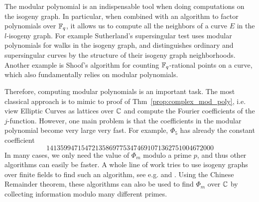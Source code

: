 The modular polynomial is an indispensable tool when doing computations on the isogeny graph.
In particular, when combined with an algorithm to factor polynomials over $\mathbb{F}_q$, it allows us to compute all the neighbors of a curve $E$ in the $l$-isogeny graph.
For example Sutherland's supersingular test \cite{sutherland_supersingularity_test} uses modular polynomials for walks in the isogeny graph, and distinguishes ordinary and supersingular curves by the structure of their isogeny graph neighborhoods.
Another example is Shoof's algorithm \cite{shoof_point_counting} for counting $\mathbb{F}_q$-rational points on a curve, which also fundamentally relies on modular polynomials.

Therefore, computing modular polynomials is an important task.
The most classical approach is to mimic to proof of Thm~\ref{prop:complex_mod_poly}, i.e. view Elliptic Curves as lattices over $\mathbb{C}$ and compute the Fourier coefficients of the $j$-function.
However, one main problem is that the coefficients in the modular polynomial become very large very fast.
For example, $\Phi_5$ has already the constant coefficient
\begin{equation*}
    141359947154721358697753474691071362751004672000
\end{equation*}
In many cases, we only need the value of $\Phi_m$ modulo a prime $p$, and thus other algorithms can easily be faster.
A whole line of work tries to use isogeny graphs over finite fields to find such an algorithm, see e.g. \cite{compute_modular_polynomial} and \cite{compute_modular_polynomial2}.
Using the Chinese Remainder theorem, these algorithms can also be used to find $\Phi_m$ over $\mathbb{C}$ by collecting information modulo many different primes.

